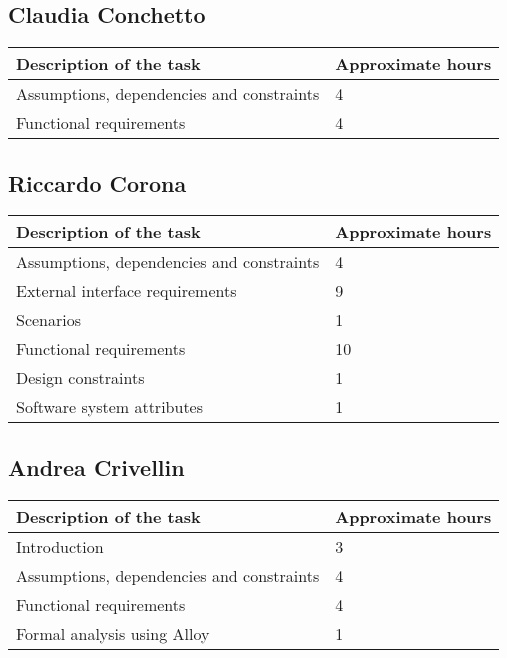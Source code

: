 
%

\subsection{Claudia Conchetto}
\begin{table}[h!]
\begin{tabular}{|l|l|}
\hline
\textbf{Description of the task} & \textbf{Approximate hours} \\ \hline
Assumptions, dependencies and constraints & 4 \\ \hline
Functional requirements & 4 \\ \hline
\end{tabular}
\end{table}

\subsection{Riccardo Corona}
\begin{table}[h!]
\begin{tabular}{|l|l|}
\hline
\textbf{Description of the task} & \textbf{Approximate hours} \\ \hline
Assumptions, dependencies and constraints & 4 \\ \hline
External interface requirements & 9 \\ \hline
Scenarios & 1 \\ \hline
Functional requirements & 10 \\ \hline
Design constraints & 1 \\ \hline
Software system attributes & 1 \\ \hline
\end{tabular}
\end{table}

\subsection{Andrea Crivellin}
\begin{table}[h!]
\begin{tabular}{|l|l|}
\hline
\textbf{Description of the task} & \textbf{Approximate hours} \\ \hline
Introduction & 3 \\ \hline
Assumptions, dependencies and constraints & 4 \\ \hline
Functional requirements & 4 \\ \hline
Formal analysis using Alloy & 1 \\ \hline
\end{tabular}
\end{table}

%
